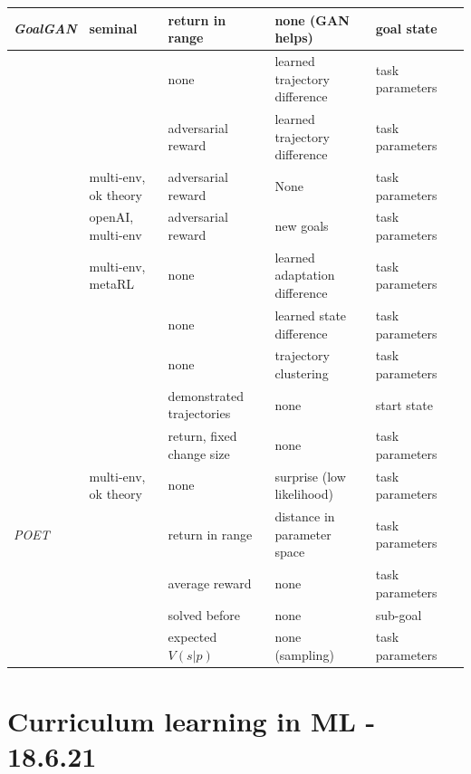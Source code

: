 \documentclass[letterpaper]{article}
\theoremstyle{definition}
\begin{document}
\begin{table}
\begin{tabular}{|l | l | l | l  | l|l|}
	\textit{GoalGAN} \cite{Florensa2018} & seminal & return in range & none (GAN helps) & goal state \\ \hline
	\cite{Mehta2019} &  & none & learned trajectory difference & task parameters \\ \hline
	\cite{Raparthy2020} & & adversarial reward & learned trajectory difference & task parameters \\ \hline
	\cite{Sukhbaatar2017} & multi-env, ok theory & adversarial reward & None & task parameters \\ \hline
	\cite{OpenAI2021} & openAI, multi-env & adversarial reward & new goals & task parameters \\ \hline
	\cite{Mehta2020} & multi-env, metaRL & none & learned adaptation difference & task parameters \\ \hline
	\cite{Gupta2018} & & none & learned state difference & task parameters \\ \hline
	\cite{Jabri2019} & & none & trajectory clustering & task parameters \\ \hline
	\cite{Srinivasan2019} & & demonstrated trajectories & none & start state \\ \hline
	\cite{Akkaya2019} & & return, fixed change size & none & task parameters \\ \hline
	\cite{Kaddour2020} & multi-env, ok theory & none & surprise (low likelihood) & task parameters \\ \hline
	\textit{POET} \cite{Wang2019} & & return in range & distance in parameter space & task parameters \\ \hline
	\cite{Milano2021} & & average reward & none & task parameters \\ \hline
	\cite{Li} & & solved before & none & sub-goal \\ \hline
	\cite{Won2019} & & expected $V(s|p)$ & none (sampling) & task parameters \\ \hline
	
\end{tabular}
\end{table}

\section{Curriculum learning in ML - 18.6.21} \label{sec:CLML}
\end{document}
